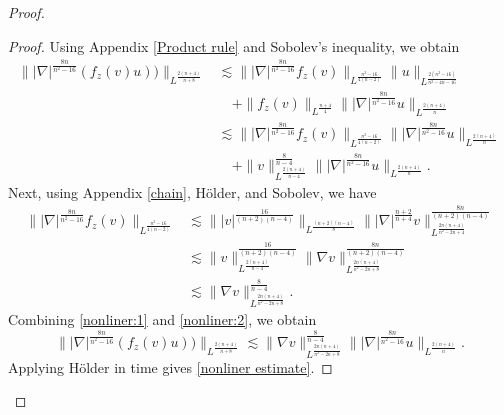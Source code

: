\documentclass[11pt,a4paper]{article}
\numberwithin{equation}{section}
\begin{document}
\begin{proof}
\begin{proof}
Using Appendix \ref{Product rule} and Sobolev's inequality, we obtain
\begin{equation}\label{nonliner:1}
\begin{aligned}
\||\nabla|^{\frac{8n}{n^{2}-16}}(f_{z}(v)u))\|_{L^{\frac{2(n+4)}{n+8}}}
&\lesssim \||\nabla|^{\frac{8n}{n^{2}-16}}f_{z}(v)\|_{L^{\frac{n^{2} - 16}{4(n-2)}}}\|u\|_{L^{\frac{2(n^{2}-16)}{n^{2}-4n-16}}} \\
&\quad + \|f_{z}(v)\|_{L^{\frac{n+4}{4}}}\||\nabla|^{\frac{8n}{n^{2}-16}}u\|_{L^{\frac{2(n+4)}{n}}} \\
&\lesssim \||\nabla|^{\frac{8n}{n^{2}-16}}f_{z}(v)\|_{L^{\frac{n^{2} - 16}{4(n-2)}}}\||\nabla|^{\frac{8n}{n^{2}-16}}u\|_{L^{\frac{2(n+4)}{n}}} \\
&\quad + \|v\|_{L^{\frac{2(n+4)}{n-4}}}^{\frac{8}{n-4}}\||\nabla|^{\frac{8n}{n^{2}-16}}u\|_{L^{\frac{2(n+4)}{n}}}.
\end{aligned}
\end{equation}
Next, using Appendix \ref{chain}, H\"older, and Sobolev, we have
\begin{equation}\label{nonliner:2}
\begin{aligned}
\||\nabla|^{\frac{8n}{n^{2}-16}}f_{z}(v)\|_{L^{\frac{n^{2} - 16}{4(n-2)}}}
&\lesssim \||v|^{\frac{16}{(n+2)(n-4)}}\|_{L^{\frac{(n+2)(n-4)}{8}}}\||\nabla|^{\frac{n+2}{n+4}}v\|_{L^{\frac{2n(n+4)}{n^{2}-2n+4}}}^{\frac{8n}{(n+2)(n-4)}}\\
&\lesssim \|v\|_{L^{\frac{2(n+4)}{n-4}}}^{\frac{16}{(n+2)(n-4)}}\|\nabla v\|_{L^{\frac{2n(n+4)}{n^{2}-2n+8}}}^{\frac{8n}{(n+2)(n-4)}} \\
&\lesssim \|\nabla v\|_{L^{\frac{2n(n+4)}{n^{2}-2n+8}}}^{\frac{8}{n-4}}.
\end{aligned}
\end{equation}
Combining \eqref{nonliner:1} and \eqref{nonliner:2}, we obtain
\[
\||\nabla|^{\frac{8n}{n^{2}-16}}(f_{z}(v)u))\|_{L^{\frac{2(n+4)}{n+8}}}
\lesssim  \|\nabla v\|_{L^{\frac{2n(n+4)}{n^{2}-2n+8}}}^{\frac{8}{n-4}}\||\nabla|^{\frac{8n}{n^{2}-16}}u\|_{L^{\frac{2(n+4)}{n}}}.
\]
Applying H\"older in time gives \eqref{nonliner estimate}.
\end{proof}


\end{proof}
\end{document}
